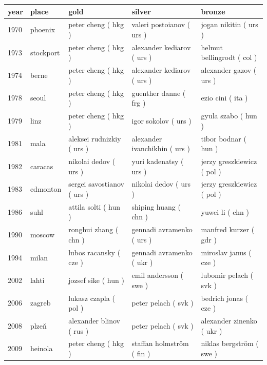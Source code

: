 \documentclass{article}
\begin{document}
\begin{tabular}{lllll}
\toprule
year & place & gold & silver & bronze \\
\midrule
1970 & phoenix & peter cheng ( hkg ) & valeri postoianov ( urs ) & jogan nikitin ( urs ) \\
1973 & stockport & peter cheng ( hkg ) & alexander kediarov ( urs ) & helmut bellingrodt ( col ) \\
1974 & berne & peter cheng ( hkg ) & alexander kediarov ( urs ) & alexander gazov ( urs ) \\
1978 & seoul & peter cheng ( hkg ) & guenther danne ( frg ) & ezio cini ( ita ) \\
1979 & linz & peter cheng ( hkg ) & igor sokolov ( urs ) & gyula szabo ( hun ) \\
1981 & mala & aleksei rudnizkiy ( urs ) & alexander ivanchikhin ( urs ) & tibor bodnar ( hun ) \\
1982 & caracas & nikolai dedov ( urs ) & yuri kadenatsy ( urs ) & jerzy greszkiewicz ( pol ) \\
1983 & edmonton & sergei savostianov ( urs ) & nikolai dedov ( urs ) & jerzy greszkiewicz ( pol ) \\
1986 & suhl & attila solti ( hun ) & shiping huang ( chn ) & yuwei li ( chn ) \\
1990 & moscow & ronghui zhang ( chn ) & gennadi avramenko ( urs ) & manfred kurzer ( gdr ) \\
1994 & milan & lubos racansky ( cze ) & gennadi avramenko ( ukr ) & miroslav janus ( cze ) \\
2002 & lahti & jozsef sike ( hun ) & emil andersson ( swe ) & lubomir pelach ( svk ) \\
2006 & zagreb & lukasz czapla ( pol ) & peter pelach ( svk ) & bedrich jonas ( cze ) \\
2008 & plzeň & alexander blinov ( rus ) & peter pelach ( svk ) & alexander zinenko ( ukr ) \\
2009 & heinola & peter cheng ( hkg ) & staffan holmström ( fin ) & niklas bergström ( swe ) \\
\bottomrule
\end{tabular}
\end{document}
